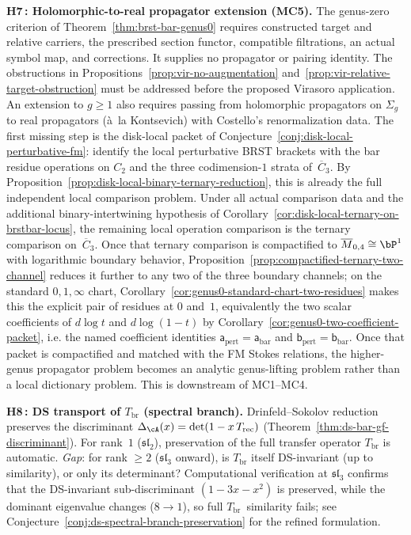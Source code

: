 \begin{remark}
\smallskip\noindent
\textbf{H7\,: Holomorphic-to-real propagator extension (MC5).}
The genus-zero criterion of Theorem~\ref{thm:brst-bar-genus0} requires constructed target and relative carriers, the prescribed section functor, compatible filtrations, an actual symbol map, and corrections.
It supplies no propagator or pairing identity.
The obstructions in Propositions~\ref{prop:vir-no-augmentation} and~\ref{prop:vir-relative-target-obstruction} must be addressed before the proposed Virasoro application.
An extension to $g\geq1$ also requires passing from
holomorphic propagators on $\Sigma_g$ to real propagators
(\`a~la Kontsevich) with Costello's renormalization data.
The first missing step is the disk-local packet of
Conjecture~\ref{conj:disk-local-perturbative-fm}: identify the local
perturbative BRST brackets with the bar residue operations on
$C_2$ and the three codimension-$1$ strata of~$\overline{C}_3$.
By Proposition~\ref{prop:disk-local-binary-ternary-reduction}, this is
already the full independent local comparison problem.
Under all actual comparison data and the additional binary-intertwining hypothesis of Corollary~\ref{cor:disk-local-ternary-on-brstbar-locus}, the remaining local operation comparison is the
ternary comparison on~$\overline{C}_3$.
Once that ternary comparison is compactified to
$\overline{M}_{0,4} \cong \bP^1$ with logarithmic boundary behavior,
Proposition~\ref{prop:compactified-ternary-two-channel} reduces it
further to any two of the three boundary channels; on the standard
$0,1,\infty$ chart,
Corollary~\ref{cor:genus0-standard-chart-two-residues} makes this the
explicit pair of residues at $0$ and~$1$, equivalently the two scalar
coefficients of $d\log t$ and $d\log(1-t)$ by
Corollary~\ref{cor:genus0-two-coefficient-packet}, i.e. the named
coefficient identities
\(\mathsf{a}_{\mathrm{pert}}=\mathsf{a}_{\mathrm{bar}}\) and
\(\mathsf{b}_{\mathrm{pert}}=\mathsf{b}_{\mathrm{bar}}\).
Once that packet is compactified and matched with the FM Stokes
relations, the higher-genus propagator problem becomes an analytic
genus-lifting problem rather than a local dictionary problem.
This is downstream of MC1--MC4.

\smallskip\noindent
\textbf{H8\,: DS transport of $T_{\mathrm{br}}$ (spectral branch).}
Drinfeld--Sokolov reduction preserves the discriminant
$\Delta_{\cA}(x) = \det(1 - x \, T_{\mathrm{rec}})$
(Theorem~\ref{thm:ds-bar-gf-discriminant}).  For rank~$1$
($\mathfrak{sl}_2$), preservation of the full transfer operator
$T_{\mathrm{br}}$ is automatic.  \emph{Gap}: for rank $\geq 2$
($\mathfrak{sl}_3$ onward), is $T_{\mathrm{br}}$ itself
DS-invariant (up to similarity), or only its determinant?
Computational verification at $\mathfrak{sl}_3$
 confirms that the DS-invariant sub-discriminant
$(1 - 3x - x^2)$ is preserved, while the dominant eigenvalue
changes ($8 \to 1$), so full $T_{\mathrm{br}}$~similarity fails;
see Conjecture~\ref{conj:ds-spectral-branch-preservation}
for the refined formulation.
\end{remark}

